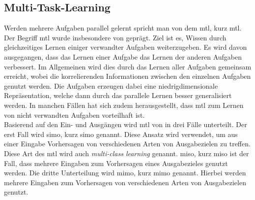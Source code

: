 		\subsection{Multi-Task-Learning}
		Werden mehrere Aufgaben parallel gelernt spricht man von dem \acl{mtl}, kurz \ac{mtl}. Der Begriff \ac{mtl} wurde insbesondere von \cite{Caruana.1998} geprägt. Ziel ist es, Wissen durch gleichzeitiges Lernen einiger verwandter Aufgaben weiterzugeben. Es wird davon ausgegangen, dass das Lernen einer Aufgabe das Lernen der anderen Aufgaben verbessert. Im Allgemeinen wird dies durch das Lernen aller Aufgaben gemeinsam erreicht, wobei die korrelierenden Informationen zwischen den einzelnen Aufgaben genutzt werden. Die Aufgaben erzeugen dabei eine niedrigdimensionale Repräsentation, welche dann durch das parallele Lernen besser generalisiert werden. In manchen Fällen hat sich zudem herausgestellt, dass \acl{mtl} zum Lernen von nicht verwandten Aufgaben vorteilhaft ist. \\
		Basierend auf den Ein- und Ausgängen wird \ac{mtl} von \cite{Thung.2018} in drei Fälle unterteilt. Der erst Fall wird  \acl{simo}, kurz \ac{simo} genannt. Diese Ansatz wird verwendet, um aus einer Eingabe Vorhersagen von verschiedenen Arten von Ausgabezielen zu treffen. Diese Art des \ac{mtl} wird auch \textit{multi-class learning} genannt. \acl{miso}, kurz \ac{miso} ist der Fall, dass mehrere Eingaben zum Vorhersagen eines Ausgabezieles genutzt werden.
		Die dritte Unterteilung wird \acl{mimo}, kurz \ac{mimo} genannt. Hierbei werden mehrere Eingaben zum Vorhersagen von verschiedenen Arten von Ausgabezielen genutzt.
